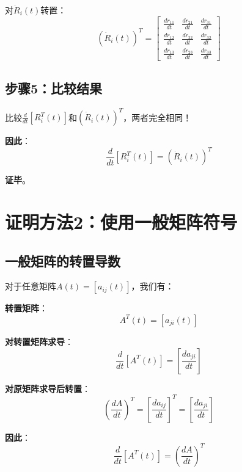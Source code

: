 \documentclass[12pt,a4paper]{article}
\begin{document}
对$\dot{R}_i(t)$转置：
\begin{equation}
(\dot{R}_i(t))^T = \begin{bmatrix}
\frac{dr_{11}}{dt} & \frac{dr_{21}}{dt} & \frac{dr_{31}}{dt} \\
\frac{dr_{12}}{dt} & \frac{dr_{22}}{dt} & \frac{dr_{32}}{dt} \\
\frac{dr_{13}}{dt} & \frac{dr_{23}}{dt} & \frac{dr_{33}}{dt}
\end{bmatrix}
\end{equation}

\subsection{步骤5：比较结果}

比较$\frac{d}{dt}[R_i^T(t)]$和$(\dot{R}_i(t))^T$，两者完全相同！

\textbf{因此}：
\begin{equation}
\frac{d}{dt}[R_i^T(t)] = (\dot{R}_i(t))^T
\end{equation}

\textbf{证毕}。

\section{证明方法2：使用一般矩阵符号}

\subsection{一般矩阵的转置导数}

对于任意矩阵$A(t) = [a_{ij}(t)]$，我们有：

\textbf{转置矩阵}：
\begin{equation}
A^T(t) = [a_{ji}(t)]
\end{equation}

\textbf{对转置矩阵求导}：
\begin{equation}
\frac{d}{dt}[A^T(t)] = \left[\frac{da_{ji}}{dt}\right]
\end{equation}

\textbf{对原矩阵求导后转置}：
\begin{equation}
\left(\frac{dA}{dt}\right)^T = \left[\frac{da_{ij}}{dt}\right]^T = \left[\frac{da_{ji}}{dt}\right]
\end{equation}

\textbf{因此}：
\begin{equation}
\frac{d}{dt}[A^T(t)] = \left(\frac{dA}{dt}\right)^T
\end{equation}
\end{document}
